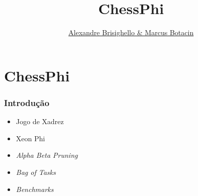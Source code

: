 \documentclass[yellow]{beamer}
\title{ChessPhi}
\author{\underline{Alexandre Brisighello \& Marcus Botacin}}
\begin{document}
\frame{
	\titlepage
}



\section{ChessPhi}


\begin{frame}
	\frametitle{Introdução}

	\begin{itemize}
		\item Jogo de Xadrez
		\item Xeon Phi
		\item \textit{Alpha Beta Pruning}
		\item \textit{Bag of Tasks}
		\item \textit{Benchmarks}
	\end{itemize}
\end{frame}

%
%
\end{document}
